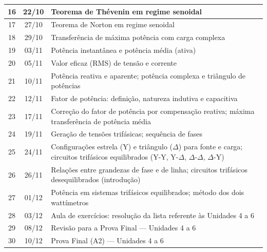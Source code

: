 \documentclass[oneside,a4paper,12pt]{article}
\begin{document}
\begin{longtable}{ |c|c|p{13cm}| }
  \hline
   16 & 22/10 & Teorema de Thévenin em regime senoidal \\
  \hline
   17 & 27/10 & Teorema de Norton em regime senoidal \\
  \hline
   18 & 29/10 & Transferência de máxima potência com carga complexa \\
  \hline
   19 & 03/11 & Potência instantânea e potência média (ativa) \\
  \hline
   20 & 05/11 & Valor eficaz (RMS) de tensão e corrente \\
  \hline
   21 & 10/11 & Potência reativa e aparente; potência complexa e triângulo de potências \\
  \hline
   22 & 12/11 & Fator de potência: definição, natureza indutiva e capacitiva \\
  \hline
   23 & 17/11 & Correção do fator de potência por compensação reativa; máxima transferência de potência média \\
  \hline
   24 & 19/11 & Geração de tensões trifásicas; sequência de fases \\
  \hline
   25 & 24/11 & Configurações estrela (Y) e triângulo ($\Delta$) para fonte e carga; circuitos trifásicos equilibrados (Y-Y, Y-$\Delta$, $\Delta$-$\Delta$, $\Delta$-Y) \\
  \hline
   26 & 26/11 & Relações entre grandezas de fase e de linha; circuitos trifásicos desequilibrados (introdução) \\
  \hline
   27 & 01/12 & Potência em sistemas trifásicos equilibrados; método dos dois wattímetros \\
  \hline
   28 & 03/12 & Aula de exercícios: resolução da lista referente às Unidades 4 a 6 \\
  \hline
   29 & 08/12 & Revisão para a Prova Final --- Unidades 4 a 6 \\
  \hline
   30 & 10/12 & Prova Final (A2) --- Unidades 4 a 6 \\
  \hline
\end{longtable}
\vspace{3mm}
\vspace{10pt}
\nocite{*}
\nocite{*}

\printbibliography[keyword=basica, title={Bibliografia Básica}]

\printbibliography[keyword=complementar, title={Bibliografia Complementar}]
%
\end{document}
